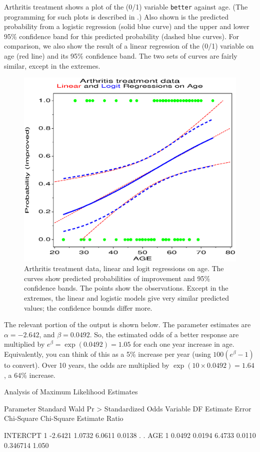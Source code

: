 \begin{Example}[arthrit6]{Arthritis treatment}
 shows a plot of the (0/1) variable \texttt{better}
against age.  (The programming for such plots is described in
.)
Also shown is the predicted probability from a logistic
regression (solid blue curve) and the upper and lower 95\% confidence
band for this predicted probability (dashed blue curves).
For comparison, we also show the result of a linear regression of
the (0/1) variable on age (red line) and its 95\% confidence band.
The two sets of curves are fairly similar, except in the extremes.
\begin{figure}[htb]
  \centering
  \includegraphics[scale=.7]{ch6/fig/logist1c1}
  \caption[Arthritis treatment data, linear and logit regressions on age]%
  {Arthritis treatment data, linear and logit regressions on age.  The curves show predicted probabilities of
improvement and 95\% confidence bands.
The points show the observations.  Except in the extremes, the linear
and logistic models give very similar predicted values; the confidence bounds
differ more.}%
  \label{fig:logist1c1}
\end{figure}

The relevant portion of the output is shown below.  The parameter estimates
are $\alpha = -2.642$, and $\beta = 0.0492$.  So, the estimated odds of
a better response are multiplied by $e^{\beta} = \exp(0.0492) = 1.05$
for each one year increase in age.  Equivalently, you can think of this
as a 5\% increase per year (using $100 (e^{\beta} -1)$ to convert).
Over 10 years, the odds are multiplied by $\exp(10 \times 0.0492) = 1.64$,
a 64\% increase.
\begin{output}
                  Analysis of Maximum Likelihood Estimates

            Parameter Standard    Wald       Pr >    Standardized    Odds
Variable DF  Estimate   Error  Chi-Square Chi-Square   Estimate     Ratio

INTERCPT 1    -2.6421   1.0732     6.0611     0.0138            .    .
AGE      1     0.0492   0.0194     6.4733     0.0110     0.346714   1.050
\end{output}
\end{Example}
